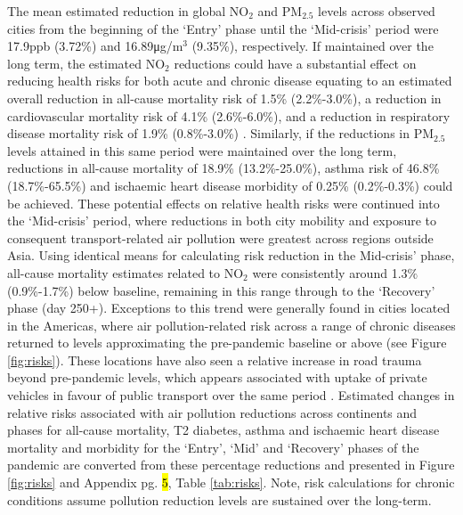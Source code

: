 \documentclass[preprint,10pt]{elsarticle} %
\begin{document}
The mean estimated reduction in global NO$_{2}$ and PM$_{2.5}$ levels across observed cities from the beginning of the `Entry' phase until the `Mid-crisis' period were 17.9ppb (3.72\%) and 16.89\si{\micro\gram}/m$^{3}$ (9.35\%), respectively. If maintained over the long term, the estimated NO$_{2}$ reductions could have a substantial effect on reducing health risks for both acute and chronic disease equating to an estimated overall reduction in all-cause mortality risk of 1.5\% (2.2\%-3.0\%), a reduction in cardiovascular mortality risk of 4.1\% (2.6\%-6.0\%), and a reduction in respiratory disease mortality risk of 1.9\% (0.8\%-3.0\%) \cite{Huang19Pollution}. Similarly, if the reductions in PM$_{2.5}$ levels attained in this same period were maintained over the long term, reductions in all-cause mortality of 18.9\% (13.2\%-25.0\%)\cite{Yu2020PM2.5}, asthma risk of 46.8\% (18.7\%-65.5\%) and ischaemic heart disease morbidity of 0.25\% (0.2\%-0.3\%)\cite{Xie257} could be achieved. These potential effects on relative health risks were continued into the `Mid-crisis' period, where reductions in both city mobility and exposure to consequent transport-related air pollution were greatest across regions outside Asia. Using identical means for calculating risk reduction in the Mid-crisis' phase, all-cause mortality estimates related to NO$_{2}$ were consistently around 1.3$\%$ (0.9\%-1.7\%) below baseline, remaining in this range through to the `Recovery' phase (day 250+). Exceptions to this trend were generally found in cities located in the Americas, where air pollution-related risk across a range of chronic diseases returned to levels approximating the pre-pandemic baseline or above (see Figure \ref{fig:risks}). These locations have also seen a relative increase in road trauma beyond pre-pandemic levels, which appears associated with uptake of private vehicles in favour of public transport over the same period \cite{ITFRS2023,saladie2023back,DAS20211}. Estimated changes in relative risks associated with air pollution reductions across continents and phases for all-cause mortality, T2 diabetes, asthma and ischaemic heart disease mortality and morbidity for the `Entry', `Mid' and `Recovery' phases of the pandemic are converted from these percentage reductions and presented in Figure \ref{fig:risks} and Appendix pg. \hl{5}, Table \ref{tab:risks}. Note, risk calculations for chronic conditions assume pollution reduction levels are sustained over the long-term.
\end{document}
